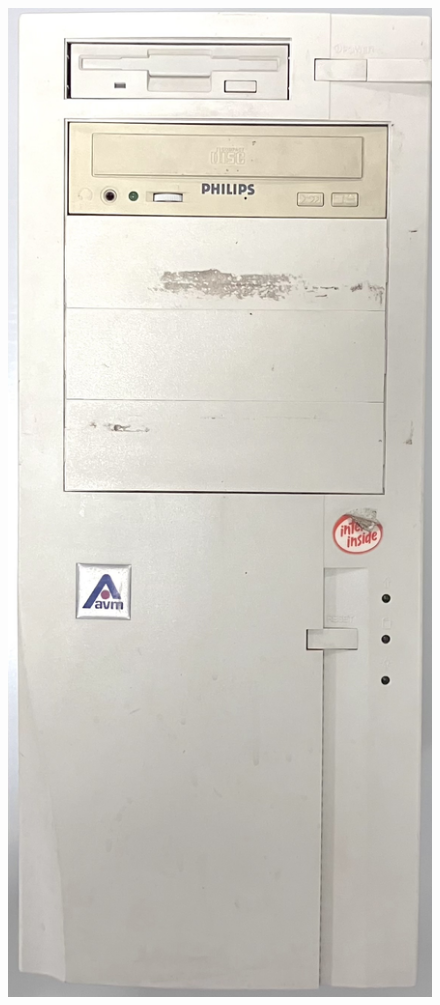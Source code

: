 \begin{figure}[h!]
    \centering
    \begin{minipage}[t]{0.48\textwidth}
        \centering
        \includegraphics[width=0.75\linewidth]{chapters/appendix/b/image/figb-ilcaosdellesfere-computer012jpg.jpg}
    \end{minipage}%
    \hfill
    \begin{minipage}[t]{0.48\textwidth}
        \centering

\end{minipage}
\end{figure}
